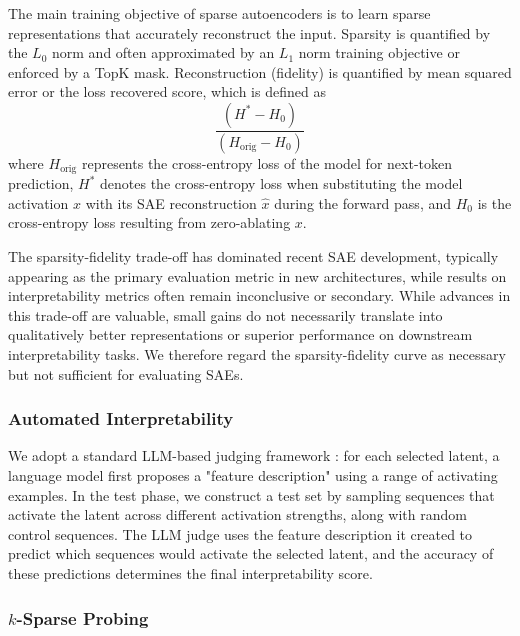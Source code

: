 \documentclass{article}
\theoremstyle{plain}
\theoremstyle{definition}
\theoremstyle{remark}
\begin{document}
The main training objective of sparse autoencoders is to learn sparse representations that accurately reconstruct the input. Sparsity is quantified by the $L_0$ norm and often approximated by an $L_1$ norm training objective or enforced by a TopK mask. Reconstruction (fidelity) is quantified by mean squared error or the loss recovered score, which is defined as
\vspace{0.1cm}
\begin{equation}
    \frac{(H^* - H_0)}{(H_{\text{orig}} - H_0)}
\end{equation}
\vspace{0.1cm}
where $H_{\text{orig}}$ represents the cross-entropy loss of the model for next-token prediction, $H^*$ denotes the cross-entropy loss when substituting the model activation $x$ with its SAE reconstruction $\hat{x}$ during the forward pass, and $H_0$ is the cross-entropy loss resulting from zero-ablating $x$.

The sparsity-fidelity trade-off has dominated recent SAE development, typically appearing as the primary evaluation metric in new architectures, while results on interpretability metrics often remain inconclusive or secondary. While advances in this trade-off are valuable, small gains do not necessarily translate into qualitatively better representations or superior performance on downstream interpretability tasks. We therefore regard the sparsity-fidelity curve as necessary but not sufficient for evaluating SAEs.

\subsubsection{Automated Interpretability}
We adopt a standard LLM-based judging framework \citep{paulo2024automaticallyinterpretingmillionsfeatures}: for each selected latent, a language model first proposes a "feature description" using a range of activating examples. In the test phase, we construct a test set by sampling sequences that activate the latent across different activation strengths, along with random control sequences. The LLM judge uses the feature description it created to predict which sequences would activate the selected latent, and the accuracy of these predictions determines the final interpretability score.

\subsubsection{$k$-Sparse Probing}
\end{document}
